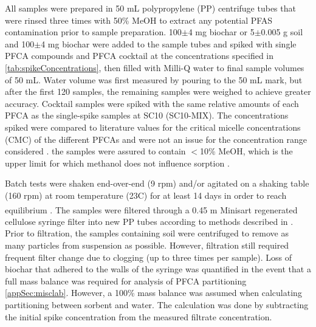 All samples were prepared in 50 mL polypropylene (PP) centrifuge tubes that were rinsed three times with 50\% MeOH to extract any potential PFAS contamination prior to sample preparation. 100$\pm$4 mg biochar or 5$\pm$0.005 g soil and 100$\pm$4 mg biochar were added to the sample tubes and spiked with single PFCA compounds and PFCA cocktail at the concentrations specified in \cref{tab:spikeConcentrations}, then filled with Milli-Q water to final sample volumes of 50 mL. Water volume was first measured by pouring to the 50 mL mark, but after the first 120 samples, the remaining samples were weighed to achieve greater accuracy. Cocktail samples were spiked with the same relative amounts of each PFCA as the single-spike samples at SC10 (SC10-MIX). The concentrations spiked were compared to literature values for the critical micelle concentrations (CMC) of the different PFCAs and were not an issue for the concentration range considered \citep{bhhatarai2011,ding2013physicochemical}. the samples were assured to contain $<$10\% MeOH, which is the upper limit for which methanol does not influence sorption \citep{arvaniti2014}.

Batch tests were shaken end-over-end (9 rpm) and/or agitated on a shaking table (160 rpm) at room temperature (23\textdegree C) for at least 14 days in order to reach equilibrium \citep{higgins2006sorption}. The samples were filtered through a 0.45 \textmu m Minisart\textsuperscript{\textregistered} regenerated cellulose syringe filter into new PP tubes according to methods described in \cite{Sorengard2019}. Prior to filtration, the samples containing soil were centrifuged to remove as many particles from suspension as possible. However, filtration still required frequent filter change due to clogging (up to three times per sample). Loss of biochar that adhered to the walls of the syringe was quantified in the event that a full mass balance was required for analysis of PFCA partitioning \cref{appSec:misclab}. However, a 100\% mass balance was assumed when calculating partitioning between sorbent and water. The calculation was done by subtracting the initial spike concentration from the measured filtrate concentration.

